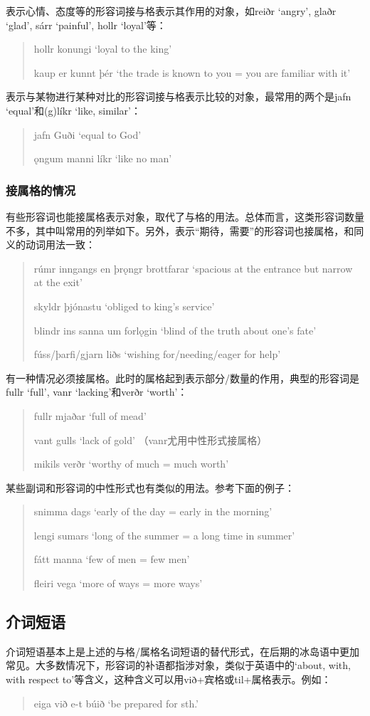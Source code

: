 表示心情、态度等的形容词接与格表示其作用的对象，如reiðr `angry', glaðr `glad', sárr `painful', hollr `loyal'等：
\begin{quote}
    hollr konungi `loyal to the king'

    kaup er kunnt þér `the trade is known to you = you are familiar with it'
\end{quote}

表示与某物进行某种对比的形容词接与格表示比较的对象，最常用的两个是jafn `equal'和(g)líkr `like, similar'：
\begin{quote}
    jafn Guði `equal to God'

    ǫngum manni líkr `like no man'
\end{quote}
\subsubsection*{接属格的情况}
有些形容词也能接属格表示对象，取代了与格的用法。总体而言，这类形容词数量不多，其中叫常用的列举如下。另外，表示“期待，需要”的形容词也接属格，和同义的动词用法一致：
\begin{quote}
    rúmr inngangs en þrǫngr brottfarar `spacious at the entrance but narrow at the exit'

    skyldr þjónastu `obliged to king's service'

    blindr ins sanna um forlǫgin `blind of the truth about one's fate'

    fúss/þarfi/gjarn liðs `wishing for/needing/eager for help'
\end{quote}
有一种情况必须接属格。此时的属格起到表示部分/数量的作用，典型的形容词是fullr `full', vanr `lacking'和verðr `worth'：
\begin{quote}
    fullr mjaðar `full of mead'

    vant gulls `lack of gold' （vanr尤用中性形式接属格）

    mikils verðr `worthy of much = much worth'
\end{quote}
某些副词和形容词的中性形式也有类似的用法。参考下面的例子：
\begin{quote}
    snimma dags `early of the day = early in the morning'

    lengi sumars `long of the summer = a long time in summer'

    fátt manna `few of men = few men'

    fleiri vega `more of ways = more ways'
\end{quote}

\subsection{介词短语}
介词短语基本上是上述的与格/属格名词短语的替代形式，在后期的冰岛语中更加常见。大多数情况下，形容词的补语都指涉对象，类似于英语中的`about, with, with respect to'等含义，这种含义可以用við+宾格或til+属格表示。例如：
\begin{quote}
    eiga við e-t búið `be prepared for sth.'


\end{quote}